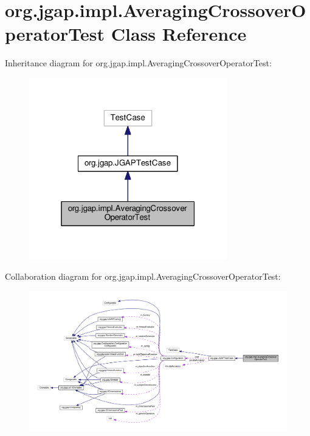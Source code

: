 \hypertarget{classorg_1_1jgap_1_1impl_1_1_averaging_crossover_operator_test}{\section{org.\-jgap.\-impl.\-Averaging\-Crossover\-Operator\-Test Class Reference}
\label{classorg_1_1jgap_1_1impl_1_1_averaging_crossover_operator_test}
}


Inheritance diagram for org.\-jgap.\-impl.\-Averaging\-Crossover\-Operator\-Test\-:
\nopagebreak
\begin{figure}[H]
\begin{center}
\leavevmode
\includegraphics[width=244pt]{classorg_1_1jgap_1_1impl_1_1_averaging_crossover_operator_test__inherit__graph}
\end{center}
\end{figure}


Collaboration diagram for org.\-jgap.\-impl.\-Averaging\-Crossover\-Operator\-Test\-:
\nopagebreak
\begin{figure}[H]
\begin{center}
\leavevmode
\includegraphics[width=350pt]{classorg_1_1jgap_1_1impl_1_1_averaging_crossover_operator_test__coll__graph}
\end{center}
\end{figure}
